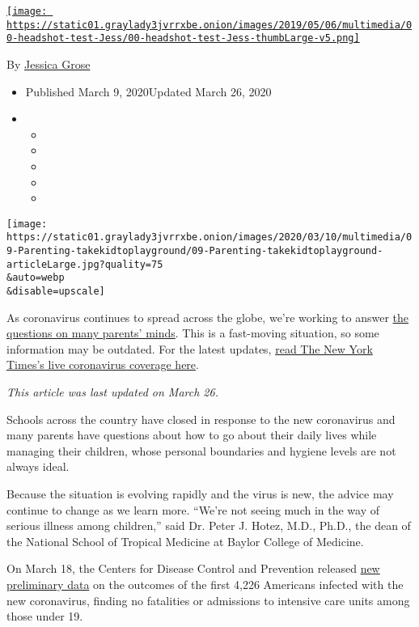 \href{https://www.nytimes3xbfgragh.onion/by/jessica-grose}{\texttt{[image: https://static01.graylady3jvrrxbe.onion/images/2019/05/06/multimedia/00-headshot-test-Jess/00-headshot-test-Jess-thumbLarge-v5.png]}}

By \href{https://www.nytimes3xbfgragh.onion/by/jessica-grose}{Jessica
Grose}

\begin{itemize}
\item
  Published March 9, 2020Updated March 26, 2020
\item
  \begin{itemize}
  \item
  \item
  \item
  \item
  \item
  \end{itemize}
\end{itemize}

\texttt{[image: https://static01.graylady3jvrrxbe.onion/images/2020/03/10/multimedia/09-Parenting-takekidtoplayground/09-Parenting-takekidtoplayground-articleLarge.jpg?quality=75\\\&auto=webp\\\&disable=upscale]}

As coronavirus continues to spread across the globe, we're working to
answer
\href{https://www.nytimes3xbfgragh.onion/spotlight/parenting-kids-coronavirus}{the
questions on many parents' minds}. This is a fast-moving situation, so
some information may be outdated. For the latest updates,
\href{https://www.nytimes3xbfgragh.onion/news-event/coronavirus}{read
The New York Times's live coronavirus coverage here}.

\emph{This article was last updated on March 26.}

Schools across the country have closed in response to the new
coronavirus and many parents have questions about how to go about their
daily lives while managing their children, whose personal boundaries and
hygiene levels are not always ideal.

Because the situation is evolving rapidly and the virus is new, the
advice may continue to change as we learn more. ``We're not seeing much
in the way of serious illness among children,'' said Dr. Peter J. Hotez,
M.D., Ph.D., the dean of the National School of Tropical Medicine at
Baylor College of Medicine.

On March 18, the Centers for Disease Control and Prevention released
\href{https://www.cdc.gov/mmwr/volumes/69/wr/mm6912e2.htm?s_cid=mm6912e2_w\&referringSource=articleShare}{new
preliminary data} on the outcomes of the first 4,226 Americans infected
with the new coronavirus, finding no fatalities or admissions to
intensive care units among those under 19.

